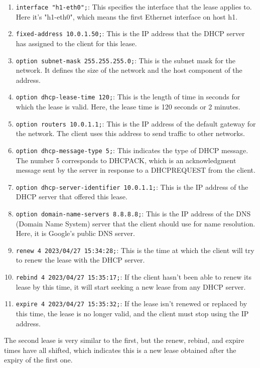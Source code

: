 \begin{enumerate}
    \item \texttt{interface "h1-eth0";}: This specifies the interface that the lease applies to. Here it's "h1-eth0", which means the first Ethernet interface on host h1.
    \item \texttt{fixed-address 10.0.1.50;}: This is the IP address that the DHCP server has assigned to the client for this lease.
    \item \texttt{option subnet-mask 255.255.255.0;}: This is the subnet mask for the network. It defines the size of the network and the host component of the address.
    \item \texttt{option dhcp-lease-time 120;}: This is the length of time in seconds for which the lease is valid. Here, the lease time is 120 seconds or 2 minutes.
    \item \texttt{option routers 10.0.1.1;}: This is the IP address of the default gateway for the network. The client uses this address to send traffic to other networks.
    \item \texttt{option dhcp-message-type 5;}: This indicates the type of DHCP message. The number 5 corresponds to DHCPACK, which is an acknowledgment message sent by the server in response to a DHCPREQUEST from the client.
    \item \texttt{option dhcp-server-identifier 10.0.1.1;}: This is the IP address of the DHCP server that offered this lease.
    \item \texttt{option domain-name-servers 8.8.8.8;}: This is the IP address of the DNS (Domain Name System) server that the client should use for name resolution. Here, it is Google's public DNS server.
    \item \texttt{renew 4 2023/04/27 15:34:28;}: This is the time at which the client will try to renew the lease with the DHCP server. 
    \item \texttt{rebind 4 2023/04/27 15:35:17;}: If the client hasn't been able to renew its lease by this time, it will start seeking a new lease from any DHCP server.
    \item \texttt{expire 4 2023/04/27 15:35:32;}: If the lease isn't renewed or replaced by this time, the lease is no longer valid, and the client must stop using the IP address.
\end{enumerate}

The second lease is very similar to the first, but the renew, rebind, and expire times have all shifted, which indicates this is a new lease obtained after the expiry of the first one.